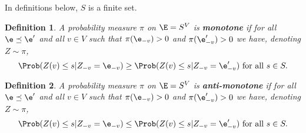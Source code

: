 \documentclass[a4paper,12pt]{article}
\newtheorem{deff}{Definition}
\begin{document}
 
\noindent
 {
\setlength\fboxsep{4pt}%
 \setlength\fboxrule{2pt}%
 }
\bigskip\bigskip
 
% 

\bigskip\par
In definitions below, $S$ is a finite set.

\begin{deff}
 A probability measure $\pi$ on $\E=S^V$ is \textbf{monotone} if 
 for all $\e\preceq\e'$ and all $v\in V$ such that $\pi(\e_{-v})>0$ and $\pi(\e'_{-v})>0$
 we have, denoting $Z\sim\pi$,
 $$\Prob(Z(v)\leq s| Z_{-v}=\e_{-v}) \geq \Prob(Z(v)\leq s| Z_{-v}=\e'_{-v}) \textrm{ for all } s\in S.$$
\end{deff}
\smallskip\par
\begin{deff}
 A probability measure $\pi$ on $\E=S^V$ is \textbf{anti-monotone} if 
 for all $\e\preceq\e'$ and all $v\in V$ such that $\pi(\e_{-v})>0$ and $\pi(\e'_{-v})>0$
 we have, denoting $Z\sim\pi$,
 $$\Prob(Z(v)\leq s| Z_{-v}=\e_{-v}) \leq \Prob(Z(v)\leq s| Z_{-v}=\e'_{-v}) \textrm{ for all } s\in S.$$
\end{deff}

\medskip\par
  
\end{document}
